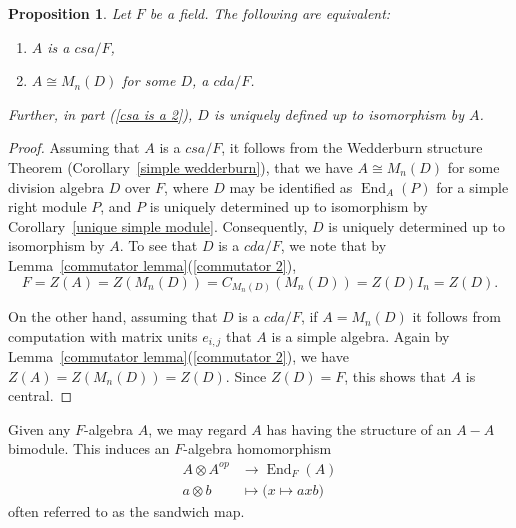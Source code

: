 \documentclass[12pt]{report}
\theoremstyle{plain}
\newtheorem{prop}[thm]{Proposition}
\newcommand{\oper}[1]{\operatorname{#1}}
\newcommand{\End}{\oper{End}}
\newcommand{\X}[1]{#1\index{#1}}
\begin{document}
\begin{prop}\label{central simple wedderburn artin}
Let $F$ be a field. The following are equivalent:
\begin{enumerate}[1. ]
\item \label{csa is a 1}
$A$ is a $csa/F$, 
\item \label{csa is a 2}
$A \cong M_n(D)$ for some $D$, a $cda/F$.
\end{enumerate}
Further, in part (\ref{csa is a 2}), $D$ is uniquely defined up to
isomorphism by $A$.
\end{prop}
\begin{proof}
Assuming that $A$ is a $csa/F$, it follows from the Wedderburn structure
Theorem (Corollary~\ref{simple wedderburn}), that we have $A \cong M_n(D)$
for some division algebra $D$ over $F$, where $D$ may be identified as
$\End_A(P)$ for a simple right module $P$, and $P$ is uniquely determined
up to isomorphism by Corollary~\ref{unique simple module}. Consequently, $D$ is uniquely determined up to
isomorphism by $A$. To see that $D$ is a $cda/F$, we note that by
Lemma~\ref{commutator lemma}(\ref{commutator 2}),
\[F = Z(A) = Z(M_n(D)) = C_{M_n(D)}(M_n(D)) = Z(D) I_n = Z(D). \]

On the other hand, assuming that $D$ is a $cda/F$, if $A = M_n(D)$ it
follows from computation with matrix units $e_{i,j}$ that $A$ is a simple
algebra. Again by Lemma~\ref{commutator lemma}(\ref{commutator 2}), we have
$Z(A) = Z(M_n(D)) = Z(D)$. Since $Z(D) = F$, this shows that $A$ is
central.
\end{proof}

Given any $F$-algebra $A$, we may regard $A$ has having the structure of an
$A-A$ bimodule. This induces an $F$-algebra homomorphism
\begin{align*}
A \otimes A^{op} &\to \End_F(A) \\
a \otimes b &\mapsto \big( x \mapsto axb \big)
\end{align*}
often referred to as the \X{sandwich map}.
\end{document}
